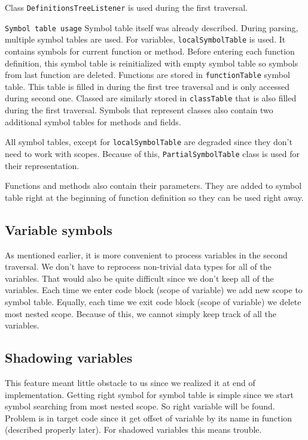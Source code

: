 \documentclass[a4paper, 11pt]{article}
\begin{document}
Class \texttt{DefinitionsTreeListener} is used during the first traversal.

\texttt{Symbol table usage}
Symbol table itself was already described. During parsing, multiple symbol tables are used. For variables, \texttt{localSymbolTable} is used. It contains symbols for current function or method. Before entering each function definition, this symbol table is reinitialized with empty symbol table so symbols from last function are deleted. Functions are stored in \texttt{functionTable} symbol table. This table is filled in during the first tree traversal and is only accessed during second one. Classed are similarly stored in \texttt{classTable} that is also filled during the first traversal. Symbols that represent classes also contain two additional symbol tables for methods and fields.

All symbol tables, except for \texttt{localSymbolTable} are degraded since they don't need to work with scopes. Because of this, \texttt{PartialSymbolTable} class is used for their representation.

Functions and methods also contain their parameters. They are added to symbol table right at the beginning of function definition so they can be used right away.

\subsection*{Variable symbols}
As mentioned earlier, it is more convenient to process variables in the second traversal. We don't have to reprocess non-trivial data types for all of the variables. That would also be quite difficult since we don't keep all of the variables. Each time we enter code block (scope of variable) we add new scope to symbol table. Equally, each time we exit code block (scope of variable) we delete most nested scope. Because of this, we cannot simply keep track of all the variables.

\subsection*{Shadowing variables}
This feature meant little obstacle to us since we realized it at end of implementation. Getting right symbol for symbol table is simple since we start symbol searching from most nested scope. So right variable will be found. Problem is in target code since it get offset of variable by its name in function (described properly later). For shadowed variables this means trouble.
\end{document}
